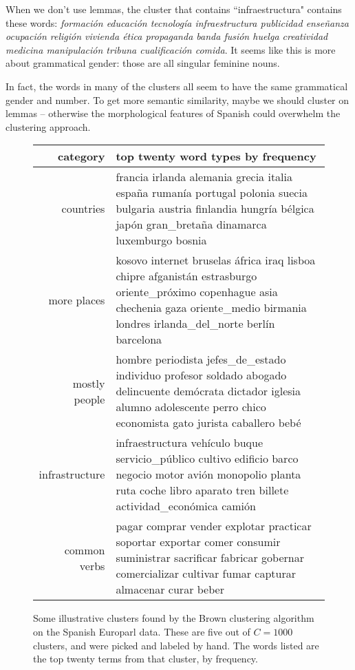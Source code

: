When we don't use lemmas, the cluster that contains ``infraestructura" contains
these words: \emph{formación educación tecnología infraestructura publicidad
enseñanza ocupación religión vivienda ética propaganda banda fusión huelga
creatividad medicina manipulación tribuna cualificación comida}. It seems like
this is more about grammatical gender: those are all singular feminine nouns.

In fact, the words in many of the clusters all seem to have the same
grammatical gender and number. To get more semantic similarity, maybe we should
cluster on lemmas -- otherwise the morphological features of Spanish could
overwhelm the clustering approach.

\begin{figure*}[t!]
  \begin{tabular}{|r|p{10cm}|}
    \hline
    category  & top twenty word types by frequency \\
    \hline
    countries & francia irlanda alemania grecia italia españa rumanía portugal polonia suecia bulgaria austria finlandia hungría bélgica japón gran\_bretaña dinamarca luxemburgo bosnia \\
    \hline
    more places & kosovo internet bruselas áfrica iraq lisboa chipre afganistán estrasburgo oriente\_próximo copenhague asia chechenia gaza oriente\_medio birmania londres irlanda\_del\_norte berlín barcelona \\
    \hline
    mostly people & hombre periodista jefes\_de\_estado individuo profesor soldado abogado delincuente demócrata dictador iglesia alumno adolescente perro chico economista gato jurista caballero bebé \\
    \hline
    infrastructure & infraestructura vehículo buque servicio\_público cultivo edificio barco negocio motor avión monopolio planta ruta coche libro aparato tren billete actividad\_económica camión \\
    \hline
    common verbs & pagar comprar vender explotar practicar soportar exportar comer consumir suministrar sacrificar fabricar gobernar comercializar cultivar fumar capturar almacenar curar beber \\
    \hline
  \end{tabular}
\caption{Some illustrative clusters found by the Brown clustering algorithm on
the Spanish Europarl data. These are five out of $C=1000$ clusters, and
were picked and labeled by hand. The words listed are the
top twenty terms from that cluster, by frequency.}
\label{fig:clusters}
\end{figure*}

